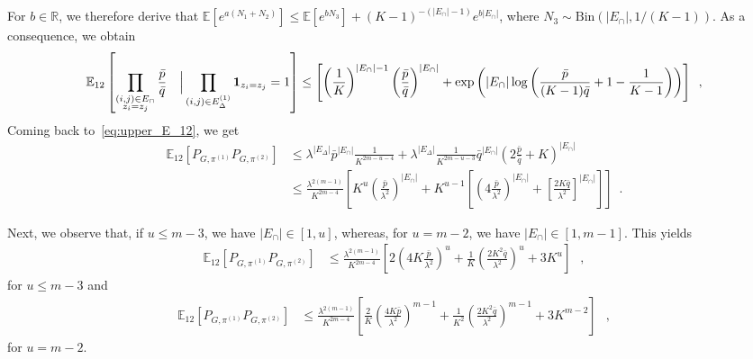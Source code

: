 \documentclass[final]{colt2026}
\newcommand{\1}{\mathbf{1}}
\newcommand{\bbE}{\mathbb{E}}
\newcommand{\cro}[1]{\left[#1\right]}
\begin{document}
For $b\in \mathbb R$, we therefore derive that  $\mathbb E[e^{a(N_1+N_2)}] \leq  \mathbb E[e^{bN_3}] + (K-1)^{-(|E_\cap|-1)} e^{b|E_\cap|}$, where $N_3 \sim  \mathrm{Bin}(|E_{\cap}|,1/(K-1))$. As a consequence, we obtain
\begin{align*}
\bbE_{12}\cro{\prod_{\substack{(i,j)\in E_{\cap}\\ z_{i}=z_{j}}}{\bar p\over \bar q}~~~\Big| \prod_{(i,j)\in E^{(1)}_{\Delta} }\mathbf 1_{z_{i}=z_{j}} = 1}  \leq
\left[\left(\frac{1}{K}\right)^{|E_{\cap}|-1}\left(\frac{\bar p}{\bar q}\right)^{|E_{\cap}|} + \exp\left(|E_{\cap}|\log\left(\frac{\bar{p}}{(K-1)\bar{q}}+1-\frac{1}{K-1}\right)\right)\right]\enspace ,
\end{align*}
 Coming back to~\eqref{eq:upper_E_12}, we get
\begin{align*}
\bbE_{12}\cro{P_{G,\pi^{(1)}}P_{G,\pi^{(2)}}}&\leq \lambda^{|E_{\Delta}|} \bar p^{|E_{\cap}|}\frac{1}{K^{2m-u-4}}+ \lambda^{|E_{\Delta}|} \frac{1}{K^{2m-u-3}} \bar q^{|E_{\cap}|} \left(2\frac{\bar{p}}{\bar{q}}+   K \right)^{|E_{\cap}|}\\
&\leq \frac{\lambda^{2(m-1)}}{K^{2m-4}}\left[K^{u} \left(\frac{\bar p}{\lambda^2}\right)^{|E_{\cap}|}+ K^{u-1}\left[\left(4 \frac{\bar{p}}{\lambda^2}\right)^{|E_{\cap}|}+ \left[\frac{2K\bar{q}}{\lambda^2} \right]^{|E_{\cap}|}  \right]\right]\enspace . 
\end{align*}

Next, we observe that, if $u\leq m-3$, we have $|E_\cap|\in [1,u]$, whereas, for $u=m-2$, we have $|E_{\cap}|\in [1,m-1]$. This yields
\begin{align}\label{eq:upper_cross_u:middle}
\bbE_{12}\cro{P_{G,\pi^{(1)}}P_{G,\pi^{(2)}}}&\leq 
 \frac{\lambda^{2(m-1)}}{K^{2m-4}}\left[ 2\left(4K\frac{\bar p}{\lambda^2}\right)^{u}+ %
 \frac{1}{K}\left(\frac{2K^2\bar{q}}{\lambda^2} \right)^{u} + 3K^u \right]\enspace \ , 
\end{align}
for $u\leq m-3$ and 
\begin{align}\label{eq:upper_cross_u:max}
\bbE_{12}\cro{P_{G,\pi^{(1)}}P_{G,\pi^{(2)}}}&\leq 
 \frac{\lambda^{2(m-1)}}{K^{2m-4}}\left[ \frac{2}{K} \left(\frac{4K\bar p}{\lambda^2}\right)^{m-1}+ %
 \frac{1}{K^2}\left(\frac{2K^2\bar{q}}{\lambda^2} \right)^{m-1} + 3K^{m-2} \right]\enspace \ , 
\end{align}
for $u=m-2$. 
\end{document}
